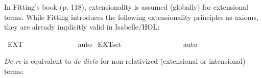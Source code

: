 \begin{isabellebody}
\begin{isamarkuptext}
In Fitting's book (p. 118), extensionality is assumed (globally) for extensional terms. While Fitting introduces 
the following extensionality principles as axioms, they are already implicitly valid in Isabelle/HOL:%
\end{isamarkuptext}\isamarkuptrue%
\isamarkupfalse%
\ EXT{\isacharcolon}\ {\isachardoublequoteopen}{\isasymforall}{\isasymalpha}{\isacharcolon}{\isacharcolon}{\isasymlangle}{\isasymzero}{\isasymrangle}{\isachardot}\ {\isasymforall}{\isasymbeta}{\isacharcolon}{\isacharcolon}{\isasymlangle}{\isasymzero}{\isasymrangle}{\isachardot}\ {\isacharparenleft}{\isasymforall}{\isasymgamma}{\isacharcolon}{\isacharcolon}{\isasymzero}{\isachardot}\ {\isacharparenleft}{\isasymalpha}\ {\isasymgamma}\ {\isasymlongleftrightarrow}\ {\isasymbeta}\ {\isasymgamma}{\isacharparenright}{\isacharparenright}\ {\isasymlongrightarrow}\ {\isacharparenleft}{\isasymalpha}\ {\isacharequal}\ {\isasymbeta}{\isacharparenright}{\isachardoublequoteclose}%
\ %
%
\isamarkupfalse%
\ auto%
%
%
\isanewline
{}\isamarkupfalse%
\ EXT{\isacharunderscore}set{\isacharcolon}\ {\isachardoublequoteopen}{\isasymforall}{\isasymalpha}{\isacharcolon}{\isacharcolon}{\isasymlangle}{\isasymlangle}{\isasymzero}{\isasymrangle}{\isasymrangle}{\isachardot}\ {\isasymforall}{\isasymbeta}{\isacharcolon}{\isacharcolon}{\isasymlangle}{\isasymlangle}{\isasymzero}{\isasymrangle}{\isasymrangle}{\isachardot}\ {\isacharparenleft}{\isasymforall}{\isasymgamma}{\isacharcolon}{\isacharcolon}{\isasymlangle}{\isasymzero}{\isasymrangle}{\isachardot}\ {\isacharparenleft}{\isasymalpha}\ {\isasymgamma}\ {\isasymlongleftrightarrow}\ {\isasymbeta}\ {\isasymgamma}{\isacharparenright}{\isacharparenright}\ {\isasymlongrightarrow}\ {\isacharparenleft}{\isasymalpha}\ {\isacharequal}\ {\isasymbeta}{\isacharparenright}{\isachardoublequoteclose}\ \isanewline
%
\ \ %
%
\isamarkupfalse%
\ auto%
%
%
%
\isamarkuptrue%
%
\begin{isamarkuptext}%
\emph{De re} is equivalent to \emph{de dicto} for non-relativized (extensional or intensional) terms:%
\end{isamarkuptext}\isamarkuptrue%
\isamarkupfalse%
\ {\isachardoublequoteopen}{\isasymlfloor}\isactrlbold {\isasymforall}{\isasymalpha}{\isachardot}\ {\isacharparenleft}{\isacharparenleft}{\isasymlambda}{\isasymbeta}{\isachardot}\ \isactrlbold {\isasymbox}{\isacharparenleft}{\isasymalpha}\ {\isasymbeta}{\isacharparenright}{\isacharparenright}\ {\isacharparenleft}{\isasymtau}{\isacharcolon}{\isacharcolon}{\isasymzero}{\isacharparenright}{\isacharparenright}\ \ \ \isactrlbold {\isasymleftrightarrow}\ \isactrlbold {\isasymbox}{\isacharparenleft}{\isacharparenleft}{\isasymlambda}{\isasymbeta}{\isachardot}\ {\isacharparenleft}{\isasymalpha}\ {\isasymbeta}{\isacharparenright}{\isacharparenright}\ {\isasymtau}{\isacharparenright}{\isasymrfloor}{\isachardoublequoteclose}%

\end{isabellebody}
